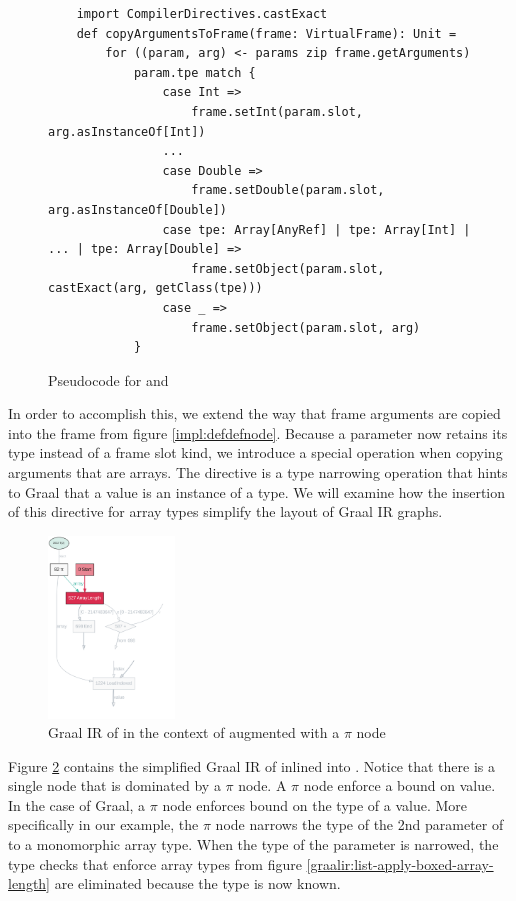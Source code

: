 \begin{figure}[!htb]
	\begin{verbatim}
	import CompilerDirectives.castExact
	def copyArgumentsToFrame(frame: VirtualFrame): Unit = 
		for ((param, arg) <- params zip frame.getArguments) 
			param.tpe match {
				case Int =>
					frame.setInt(param.slot, arg.asInstanceOf[Int])
				...
				case Double =>
					frame.setDouble(param.slot, arg.asInstanceOf[Double])	
				case tpe: Array[AnyRef] | tpe: Array[Int] | ... | tpe: Array[Double] =>
					frame.setObject(param.slot, castExact(arg, getClass(tpe)))
				case _ =>
					frame.setObject(param.slot, arg)
			}
	\end{verbatim}
	\caption{Pseudocode for  and }
	\label{impl:specialized-copy-arguments}
\end{figure}

In order to accomplish this, we extend the way that frame arguments are copied into the frame from figure \ref{impl:defdefnode}.
Because a parameter now retains its type instead of a frame slot kind, we introduce a special operation when copying arguments that are arrays. 
The  directive is a type narrowing operation that hints to Graal that a value is an instance of a type.
We will examine how the insertion of this directive for array types simplify the layout of Graal IR graphs.

\begin{figure}[!htb]
	\centering
	\includegraphics[width=0.3\textwidth]{figures/dot/List.apply.specialized.array_length.png}
	\caption{Graal IR of  in the context of  augmented with a $\pi$ node}
	\label{graalir:list-apply-specialized-array-length}
\end{figure}

Figure \ref{graalir:list-apply-specialized-array-length} contains the simplified Graal IR of  inlined into .
Notice that there is a single  node that is dominated by a $\pi$ node.
A $\pi$ node\cite{abdc:pi-nodes} enforce a bound on value.
In the case of Graal, a $\pi$ node enforces bound on the type of a value.
More specifically in our example, the $\pi$ node narrows the type of the 2nd parameter of  to a monomorphic array type.
When the type of the parameter is narrowed, the type checks that enforce array types from figure \ref{graalir:list-apply-boxed-array-length} are eliminated because the type is now known.

